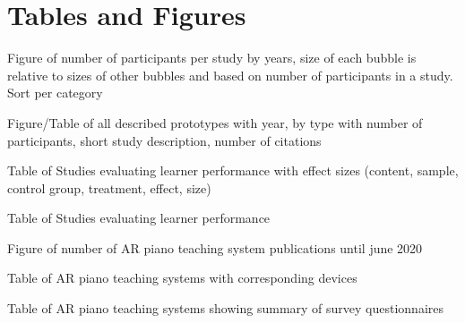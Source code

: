 \documentclass{article}
\begin{document}
\section{Tables and Figures}
Figure of number of participants per study by years, size of each bubble is relative to sizes of other bubbles and based on number of participants in a study. Sort per category 

Figure/Table of all described prototypes with year, by type with number of participants, short study description, number of citations

Table of Studies evaluating learner performance with effect sizes (content, sample, control group, treatment, effect, size)

Table of Studies evaluating learner performance 

Figure of number of AR piano teaching system publications until june 2020

Table of AR piano teaching systems with corresponding devices 

Table of AR piano teaching systems showing summary of survey
questionnaires














\end{document}
